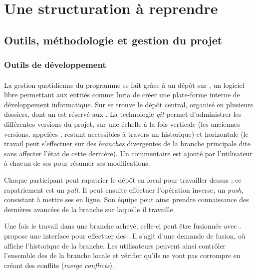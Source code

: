 \part{Une structuration à reprendre}

\clearpage
\thispagestyle{empty}
\cleardoublepage

\chapter{Outils, méthodologie et gestion du projet}


\section{Outils de développement}

\subsection{\gitlab}

La gestion quotidienne du programme \timeus{} se fait grâce à un dépôt sur \gitlab{}, un logiciel libre permettant aux entités comme Inria de créer une plate-forme interne de développement informatique. Sur \gitlab{} se trouve le dépôt central, organisé en plusieurs dossiers, dont un est réservé aux \odm. La technologie \textit{git} permet d'administrer les différentes versions du projet, sur une échelle à la fois verticale (les anciennes versions, appelées \commits, restant accessibles à travers un historique) et horizontale (le travail peut s'effectuer sur des \textit{branches} divergentes de la branche principale dite \master{} sans affecter l'état de cette dernière). Un commentaire est ajouté par l'utilisateur à chacun de ses \commits{} pour résumer ses modifications.

Chaque participant peut rapatrier le dépôt \gitlab{} en local pour travailler dessus ; ce rapatriement est un \textit{pull}. Il peut ensuite effectuer l'opération inverse, un \textit{push}, consistant à mettre ses \commits{} en ligne. Son équipe peut ainsi prendre connaissance des dernières avancées de la branche sur laquelle il travaille.

Une fois le travail dans une branche achevé, celle-ci peut être fusionnée avec \master. \gitlab{} propose une interface pour effectuer des \mergerequests{}. Il s'agit d'une demande de fusion, où \gitlab{} affiche l'historique de la branche. Les utilisateurs peuvent ainsi contrôler l'ensemble des \commits{} de la branche locale et vérifier qu'ils ne vont pas corrompre \master{} en créant des conflits (\textit{merge conflicts}).

